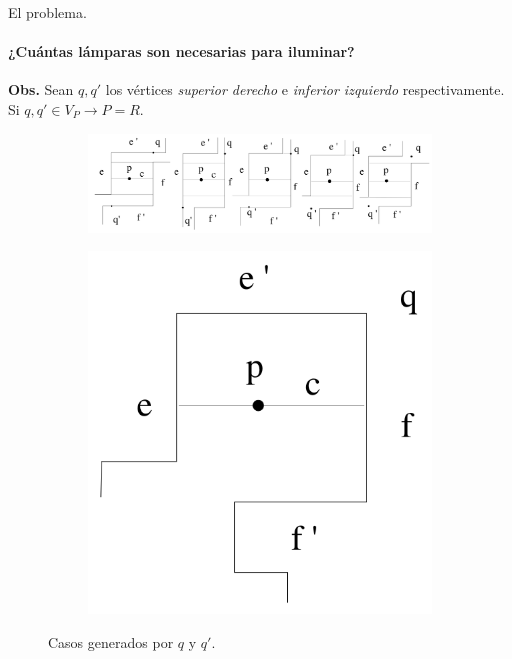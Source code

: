 \begin{frame}{El problema.} %
  \framesubtitle{¿Cuántas lámparas son necesarias para iluminar?} %
  \textbf{Obs.} Sean $q, q'$ los vértices \textit{superior derecho} e \textit{inferior izquierdo} respectivamente.
  Si $q, q' \in V_P \rightarrow P = R$.

  \begin{figure}
    \centering
    \begin{subfigure}[b]{0.59\paperwidth}
      \includegraphics[width=.6 \paperwidth]{./images/CasosOrtogonales.png}
    \end{subfigure}
    \begin{subfigure}[b]{0.1\paperwidth}
      \includegraphics[width=.16 \paperwidth]{./images/CasoOrtogonal.png}
    \end{subfigure}
    \caption*{Casos generados por $q$ y $q'$.}
  \end{figure}
\end{frame}

